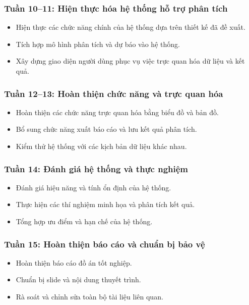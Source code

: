 \subsubsection*{Tuần 10--11: Hiện thực hóa hệ thống hỗ trợ phân tích}
\begin{itemize}
    \item Hiện thực các chức năng chính của hệ thống dựa trên thiết kế đã đề xuất.
    \item Tích hợp mô hình phân tích và dự báo vào hệ thống.
    \item Xây dựng giao diện người dùng phục vụ việc trực quan hóa dữ liệu và kết quả.
\end{itemize}

\subsubsection*{Tuần 12--13: Hoàn thiện chức năng và trực quan hóa}
\begin{itemize}
    \item Hoàn thiện các chức năng trực quan hóa bằng biểu đồ và bản đồ.
    \item Bổ sung chức năng xuất báo cáo và lưu kết quả phân tích.
    \item Kiểm thử hệ thống với các kịch bản dữ liệu khác nhau.
\end{itemize}

\subsubsection*{Tuần 14: Đánh giá hệ thống và thực nghiệm}
\begin{itemize}
    \item Đánh giá hiệu năng và tính ổn định của hệ thống.
    \item Thực hiện các thí nghiệm minh họa và phân tích kết quả.
    \item Tổng hợp ưu điểm và hạn chế của hệ thống.
\end{itemize}

\subsubsection*{Tuần 15: Hoàn thiện báo cáo và chuẩn bị bảo vệ}
\begin{itemize}
    \item Hoàn thiện báo cáo đồ án tốt nghiệp.
    \item Chuẩn bị slide và nội dung thuyết trình.
    \item Rà soát và chỉnh sửa toàn bộ tài liệu liên quan.
\end{itemize}
